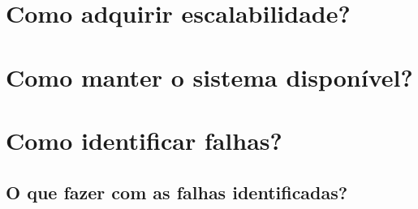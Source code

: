     \section{Como adquirir escalabilidade?}

    \section{Como manter o sistema disponível?}

    \section{Como identificar falhas?}

      \subsection{O que fazer com as falhas identificadas?}
